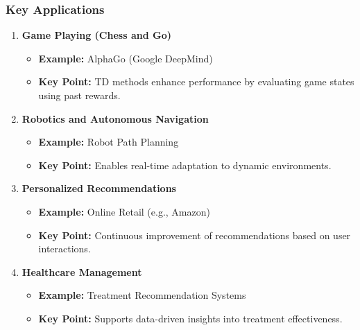 \documentclass[aspectratio=169]{beamer}
\begin{document}
\begin{frame}
    \frametitle{Key Applications}
    \begin{enumerate}
        \item \textbf{Game Playing (Chess and Go)}
            \begin{itemize}
                \item \textbf{Example:} AlphaGo (Google DeepMind)
                \item \textbf{Key Point:} TD methods enhance performance by evaluating game states using past rewards.
            \end{itemize}
        
        \item \textbf{Robotics and Autonomous Navigation}
            \begin{itemize}
                \item \textbf{Example:} Robot Path Planning
                \item \textbf{Key Point:} Enables real-time adaptation to dynamic environments.
            \end{itemize}
        
        \item \textbf{Personalized Recommendations}
            \begin{itemize}
                \item \textbf{Example:} Online Retail (e.g., Amazon)
                \item \textbf{Key Point:} Continuous improvement of recommendations based on user interactions.
            \end{itemize}
        
        \item \textbf{Healthcare Management}
            \begin{itemize}
                \item \textbf{Example:} Treatment Recommendation Systems
                \item \textbf{Key Point:} Supports data-driven insights into treatment effectiveness.
            \end{itemize}
    \end{enumerate}
\end{frame}
\end{document}
